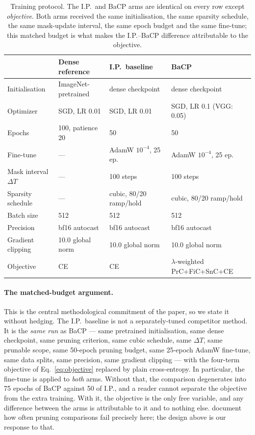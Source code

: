 \begin{table}[t]
\centering
\small
\caption{Training protocol. The I.P.\ and BaCP arms are identical on every row
except \emph{objective}. Both arms received the same initialisation, the same
sparsity schedule, the same mask-update interval, the same epoch budget and the
same fine-tune; this matched budget is what makes the I.P.--BaCP difference
attributable to the objective.}
\label{tab:protocol}
\begin{tabular}{llll}
\toprule
 & Dense reference & I.P.\ baseline & BaCP \\
\midrule
Initialisation      & ImageNet-pretrained & dense checkpoint & dense checkpoint \\
Optimizer           & SGD, LR 0.01 & SGD, LR 0.01 & SGD, LR 0.1 (VGG: 0.05) \\
Epochs              & 100, patience 20 & 50 & 50 \\
Fine-tune           & --- & AdamW $10^{-4}$, 25 ep. & AdamW $10^{-4}$, 25 ep. \\
Mask interval $\Delta T$ & --- & 100 steps & 100 steps \\
Sparsity schedule   & --- & cubic, 80/20 ramp/hold & cubic, 80/20 ramp/hold \\
Batch size          & 512 & 512 & 512 \\
Precision           & bf16 autocast & bf16 autocast & bf16 autocast \\
Gradient clipping   & 10.0 global norm & 10.0 global norm & 10.0 global norm \\
Objective           & CE & CE & $\lambda$-weighted PrC+FiC+SnC+CE \\
\bottomrule
\end{tabular}
\end{table}

\paragraph{The matched-budget argument.}
This is the central methodological commitment of the paper, so we state it
without hedging. The I.P.\ baseline is not a separately-tuned competitor method.
It is the \emph{same run} as BaCP --- same pretrained initialisation, same dense
checkpoint, same pruning criterion, same cubic schedule, same $\Delta T$, same
prunable scope, same 50-epoch pruning budget, same 25-epoch AdamW fine-tune, same
data splits, same precision, same gradient clipping --- with the four-term
objective of Eq.~\eqref{eq:objective} replaced by plain cross-entropy. In
particular, the fine-tune is applied to \emph{both} arms. Without that, the
comparison degenerates into 75 epochs of BaCP against 50 of I.P., and a reader
cannot separate the objective from the extra training. With it, the objective is
the only free variable, and any difference between the arms is attributable to it
and to nothing else. \citet{blalock2020state} document how often pruning
comparisons fail precisely here; the design above is our response to that.

